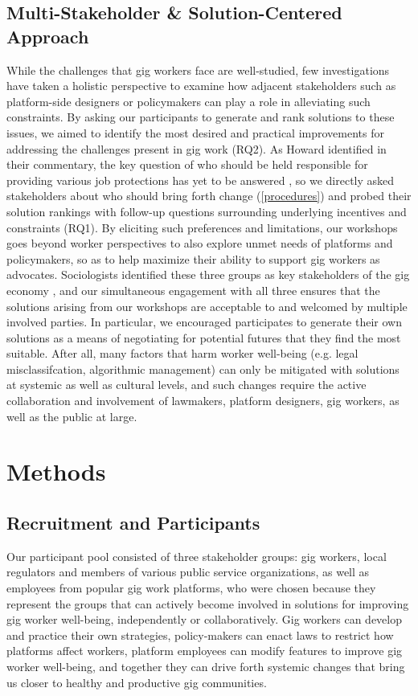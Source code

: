 \subsection{Multi-Stakeholder \& Solution-Centered Approach}

While the challenges that gig workers face are well-studied, few investigations have taken a holistic perspective to examine how adjacent stakeholders such as platform-side designers or policymakers can play a role in alleviating such constraints. 
By asking our participants to generate and rank solutions to these issues, we aimed to identify the most desired and practical improvements for addressing the challenges present in gig work (RQ2). As Howard identified in their commentary, the key question of who should be held responsible for providing various job protections has yet to be answered \cite{Howard2017-wd}, so we directly asked stakeholders about who should bring forth change (\ref{procedures}) and probed their solution rankings with follow-up questions surrounding underlying incentives and constraints (RQ1).
By eliciting such preferences and limitations, our workshops goes beyond worker perspectives to also explore unmet needs of platforms and policymakers, so as to help maximize their ability to support gig workers as advocates. 
Sociologists identified these three groups as key stakeholders of the gig economy \cite{vallas2020platforms}, and our simultaneous engagement with all three ensures that the solutions arising from our workshops are acceptable to and welcomed by multiple involved parties. 
In particular, we encouraged participates to generate their own solutions as a means of negotiating for potential futures that they find the most suitable. 
After all, many factors that harm worker well-being (e.g. legal misclassifcation, algorithmic management) can only be mitigated with solutions at systemic as well as cultural levels, and such changes require the active collaboration and involvement of lawmakers, platform designers, gig workers, as well as the public at large.

\newpage
\section{Methods}


\subsection{Recruitment and Participants} \label{recruit}
Our participant pool consisted of three stakeholder groups: gig workers, local regulators and members of various public service organizations, as well as employees from popular gig work platforms, who were chosen because they represent the groups that can actively become involved in solutions for improving gig worker well-being, independently or collaboratively. Gig workers can develop and practice their own strategies, policy-makers can enact laws to restrict  how platforms affect workers, platform employees can modify features to improve gig worker well-being, and together they can drive forth systemic changes that bring us closer to healthy and productive gig communities.

